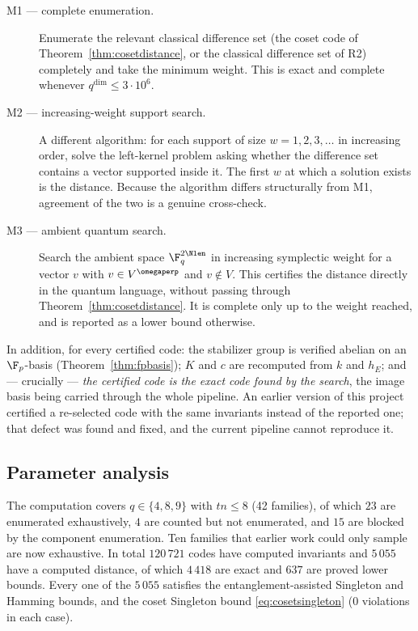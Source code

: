 \begin{description}
\item[M1 --- complete enumeration.] Enumerate the relevant classical difference
  set (the coset code of Theorem~\ref{thm:cosetdistance}, or the classical
  difference set of R2) completely and take the minimum weight. This is exact
  and complete whenever $q^{\dim}\le3\cdot10^6$.
\item[M2 --- increasing-weight support search.] A different algorithm: for each
  support of size $w=1,2,3,\dots$ in increasing order, solve the left-kernel
  problem asking whether the difference set contains a vector supported inside
  it. The first $w$ at which a solution exists is the distance. Because the
  algorithm differs structurally from M1, agreement of the two is a genuine
  cross-check.
\item[M3 --- ambient quantum search.] Search the ambient space
  $\F_q^{2\Nlen}$ in increasing symplectic weight for a vector $v$ with
  $v\in V^{\omegaperp}$ and $v\notin V$. This certifies the distance directly in
  the quantum language, without passing through
  Theorem~\ref{thm:cosetdistance}. It is complete only up to the weight reached,
  and is reported as a lower bound otherwise.
\end{description}

In addition, for every certified code: the stabilizer group is verified abelian
on an $\F_p$-basis (Theorem~\ref{thm:fpbasis}); $K$ and $c$ are recomputed from
$k$ and $h_E$; and --- crucially --- \emph{the certified code is the exact code
found by the search}, the image basis being carried through the whole pipeline.
An earlier version of this project certified a re-selected code with the same
invariants instead of the reported one; that defect was found and fixed, and the
current pipeline cannot reproduce it.

\subsection{Parameter analysis}

The computation covers $q\in\{4,8,9\}$ with $tn\le8$ (42 families), of which
$23$ are enumerated exhaustively, $4$ are counted but not enumerated, and $15$
are blocked by the component enumeration. Ten families that earlier work could
only sample are now exhaustive. In total $120\,721$ codes have computed
invariants and $5\,055$ have a computed distance, of which $4\,418$ are exact
and $637$ are proved lower bounds. Every one of the $5\,055$ satisfies the
entanglement-assisted Singleton and Hamming bounds, and the coset Singleton
bound \eqref{eq:cosetsingleton} (0 violations in each case).

